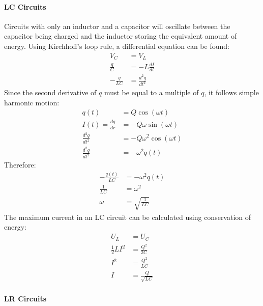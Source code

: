 \documentclass{article}
\begin{document}
            \paragraph{LC Circuits}
            Circuits with only an inductor and a capacitor will oscillate between the capacitor being charged and the inductor storing the equivalent amount of energy. Using Kirchhoff's loop rule, a differential equation can be found:
            \begin{align}
                V_C &= V_L \nonumber\\
                \frac{q}{C} &= - L \frac{dI}{dt} \nonumber\\
                - \frac{q}{LC} &= \frac{d^2q}{dt^2} \nonumber
            \end{align}
            Since the second derivative of $q$ must be equal to a multiple of $q$, it follows simple harmonic motion:
            \begin{align}
                q(t) &= Q \cos \left( \omega t \right) \nonumber\\
                I(t) = \frac{dq}{dr} &= - Q \omega \sin \left( \omega t \right) \nonumber\\
                \frac{d^2q}{dt^2} &= - Q \omega^2 \cos \left( \omega t \right) \nonumber\\
                \frac{d^2q}{dt^2} &= - \omega^2 q(t) \nonumber
            \end{align}
            Therefore:
            \begin{align}
                - \frac{q(t)}{LC} &= - \omega^2 q(t) \nonumber \nonumber\\
                \frac{1}{LC} &= \omega^2 \nonumber\\
                \omega &= \sqrt{\frac{1}{LC}}
            \end{align}
            The maximum current in an LC circuit can be calculated using conservation of energy:
            \begin{align}
                U_L &= U_C \nonumber\\
                \frac{1}{2} L I^2 &= \frac{Q^2}{2C} \nonumber\\
                I^2 &= \frac{Q^2}{LC} \nonumber\\
                I &= \frac{Q}{\sqrt{LC}}
            \end{align}

            \paragraph{LR Circuits}
\end{document}
